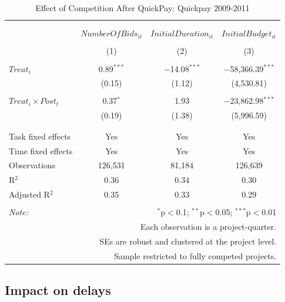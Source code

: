 \documentclass[
]{article}
\begin{document}
\begin{table}[H] \centering 
  \caption{Effect of Competition After QuickPay: Quickpay 2009-2011} 
  \label{} 
\small 
\begin{tabular}{@{\extracolsep{0pt}}lccc} 
\\[-1.8ex]\hline 
\hline \\[-1.8ex] 
\\[-1.8ex] & $NumberOfBids_{it}$ & $InitialDuration_{it}$ & $InitialBudget_{it}$ \\ 
\\[-1.8ex] & (1) & (2) & (3)\\ 
\hline \\[-1.8ex] 
 $Treat_i$ & 0.89$^{***}$ & $-$14.08$^{***}$ & $-$58,366.39$^{***}$ \\ 
  & (0.15) & (1.12) & (4,530.81) \\ 
  & & & \\ 
 $Treat_i \times Post_t$ & 0.37$^{*}$ & 1.93 & $-$23,862.98$^{***}$ \\ 
  & (0.19) & (1.38) & (5,996.59) \\ 
  & & & \\ 
\hline \\[-1.8ex] 
Task fixed effects & Yes & Yes & Yes \\ 
Time fixed effects & Yes & Yes & Yes \\ 
Observations & 126,531 & 81,184 & 126,639 \\ 
R$^{2}$ & 0.36 & 0.34 & 0.30 \\ 
Adjusted R$^{2}$ & 0.35 & 0.33 & 0.29 \\ 
\hline 
\hline \\[-1.8ex] 
\textit{Note:}  & \multicolumn{3}{r}{$^{*}$p$<$0.1; $^{**}$p$<$0.05; $^{***}$p$<$0.01} \\ 
 & \multicolumn{3}{r}{Each observation is a project-quarter.} \\ 
 & \multicolumn{3}{r}{SEs are robust and clustered at the project level.} \\ 
 & \multicolumn{3}{r}{Sample restricted to fully competed projects.} \\ 
\end{tabular} 
\end{table}

\hypertarget{impact-on-delays}{%
\subsection{Impact on delays}\label{impact-on-delays}}
\end{document}
